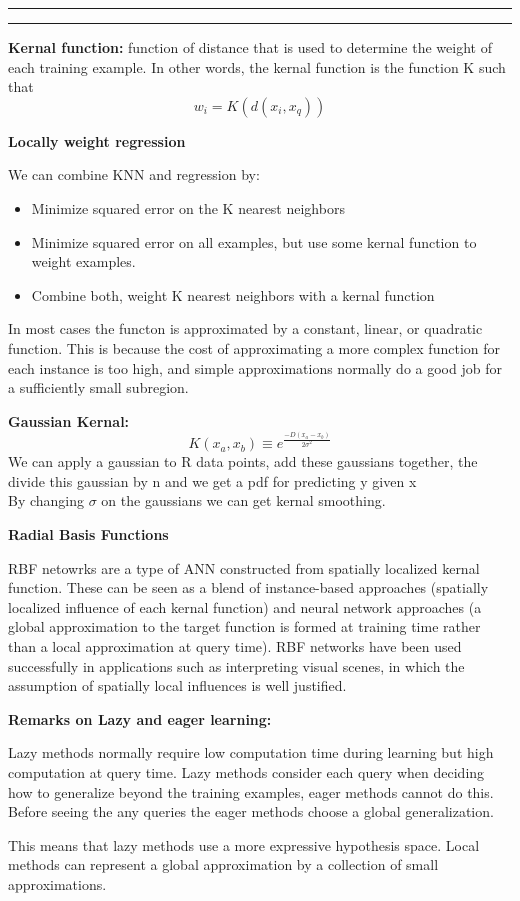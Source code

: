 \documentclass[11pt]{article}
\newcounter{questionCounter}
\newcounter{partCounter}[questionCounter]
\newenvironment{question}[2][\arabic{questionCounter}]{%
    \addtocounter{questionCounter}{1}%
    \setcounter{partCounter}{0}%
    \vspace{.25in} \hrule \vspace{0.5em}%
        \noindent{\bf #1: #2}%
    \vspace{0.8em} \hrule \vspace{.10in}%
}{}
\begin{document}
\begin{question}{Instance-Based Learning}
\textbf{Kernal function:} function of distance that is used to determine the weight of each training example.
In other words, the kernal function is the function K such that $$w_i = K(d(x_i, x_q))$$

\textbf{Locally weight regression}

We can combine KNN and regression by:

\begin{itemize}
    \item Minimize squared error on the K nearest neighbors \\
    \item Minimize squared error on all examples, but use some kernal function to weight examples. \\
    \item Combine both, weight K nearest neighbors with a kernal function \\
\end{itemize}

In most cases the functon is approximated by a constant, linear, or quadratic function.
This is because the cost of approximating a more complex function for each instance
is too high, and simple approximations normally do a good job for a sufficiently
small subregion.

\textbf{Gaussian Kernal:}
$$K(x_a, x_b) \equiv e^{\frac{-D(x_a - x_b)}{2\sigma^2}}$$
We can apply a gaussian to R data points, add these gaussians
together, the divide this gaussian by n and we get a pdf for
predicting y given x\\
By changing $\sigma$ on the gaussians we can get kernal smoothing.


\textbf{Radial Basis Functions}

RBF netowrks are a type of ANN constructed from spatially localized
kernal function. These can be seen as a blend of instance-based
approaches (spatially localized influence of each kernal function) and
neural network approaches (a global approximation to the
target function is formed at training time rather than a local
approximation
at query time). RBF networks have been used successfully in applications such as interpreting
visual scenes, in which the assumption of spatially
local influences is well justified.

\textbf{Remarks on Lazy and eager learning:}

Lazy methods normally require low computation time during learning
but high computation at query time.
Lazy methods consider each query when deciding how to generalize beyond the
training examples, eager methods cannot do this. Before seeing the any queries
the eager methods choose a global generalization.

This means that lazy methods use a more expressive hypothesis space. 
Local methods can represent a global approximation by a collection of 
small approximations. 

\end{question}
\end{document}
